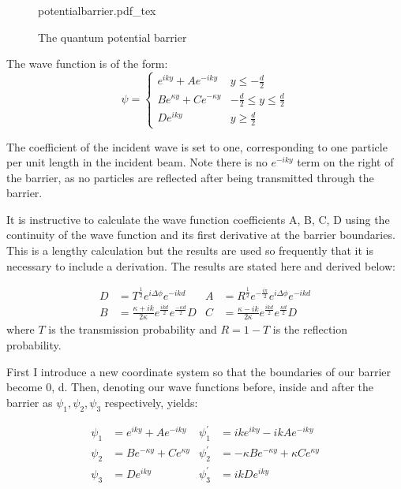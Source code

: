 \documentclass{article}
\newcommand{\incfig}[1]{%
    \def\svgwidth{10cm}
    {#1.pdf_tex}
}
\begin{document}
\begin{figure}[ht]
    \centering
    \incfig{potentialbarrier}
    \caption{The quantum potential barrier}
    \label{fig:potentialbarrier}
\end{figure}

\noindent The wave function is of the form:
\begin{equation}
	\psi = 
	\begin{cases}
		e^{iky} + Ae^{-iky} & y \leq -\frac{d}{2} \\
		Be^{\kappa y} + Ce^{-\kappa y} & -\frac{d}{2} \leq y \leq \frac{d}{2} \\
		De^{iky} & y \geq \frac{d}{2}
	\end{cases}
\end{equation}

\noindent The coefficient of the incident wave is set to one, corresponding to one particle per unit length in the incident beam. Note there is no $e^{-iky}$ term on the right of the barrier, as no particles are reflected after being transmitted through the barrier.

\noindent It is instructive to calculate the wave function coefficients A, B, C, D using the continuity of the wave function and its first derivative at the barrier boundaries. This is a lengthy calculation but the results are used so frequently that it is necessary to include a derivation. The results are stated here and derived below:

\begin{align}
	D &= T^{\frac{1}{2}}e^{i\Delta\phi}e^{-ikd} & A &= R^{\frac{1}{2}}e^{-\frac{i\pi}{2}}e^{i\Delta\phi}e^{-ikd} \nonumber \\
	B &= \frac{\kappa+ik}{2\kappa}e^{\frac{ikd}{2}}e^{\frac{-\kappa d}{2}}D & C &= \frac{\kappa-ik}{2\kappa}e^{\frac{ikd}{2}}e^{\frac{\kappa d}{2}}D \label{cont0}
\end{align}
where $T$ is the transmission probability and $R = 1-T$ is the reflection probability.

\noindent First I introduce a new coordinate system so that the boundaries of our barrier become 0, d. Then, denoting our wave functions before, inside and after the barrier as $\psi_{1}, \psi_{2}, \psi_{3}$ respectively, yields:

\begin{align}
	\psi_{1} &= e^{iky} + Ae^{-iky} & \psi_{1}^{'} &= ike^{iky} - ikAe^{-iky} \\
	\psi_{2} &= Be^{-\kappa y} + Ce^{\kappa y} & \psi_{2}^{'} &= -\kappa Be^{-\kappa y} + \kappa Ce^{\kappa y} \\
	\psi_{3} &= De^{iky} & \psi_{3}^{'} &= ikDe^{iky}
\end{align}
\end{document}
